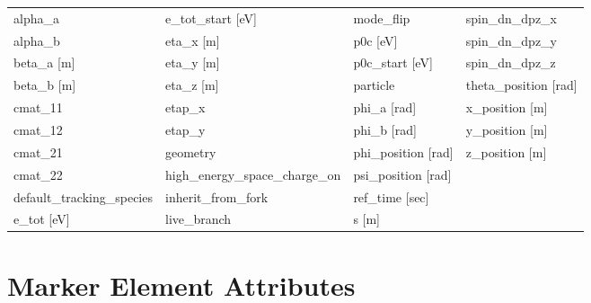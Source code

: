 \begin{tabular}{llll} \toprule
alpha_a                          & e_tot_start [eV]                 & mode_flip                        & spin_dn_dpz_x                    \\
alpha_b                          & eta_x [m]                        & p0c [eV]                         & spin_dn_dpz_y                    \\
beta_a [m]                       & eta_y [m]                        & p0c_start [eV]                   & spin_dn_dpz_z                    \\
beta_b [m]                       & eta_z [m]                        & particle                         & theta_position [rad]             \\
cmat_11                          & etap_x                           & phi_a [rad]                      & x_position [m]                   \\
cmat_12                          & etap_y                           & phi_b [rad]                      & y_position [m]                   \\
cmat_21                          & geometry                         & phi_position [rad]               & z_position [m]                   \\
cmat_22                          & high_energy_space_charge_on      & psi_position [rad]               &                                  \\
default_tracking_species         & inherit_from_fork                & ref_time [sec]                   &                                  \\
e_tot [eV]                       & live_branch                      & s [m]                            &                                  \\
 \bottomrule
 \end{tabular}
 \vfill
 
 \section{Marker Element Attributes}
 \label{s:list.marker}
 
